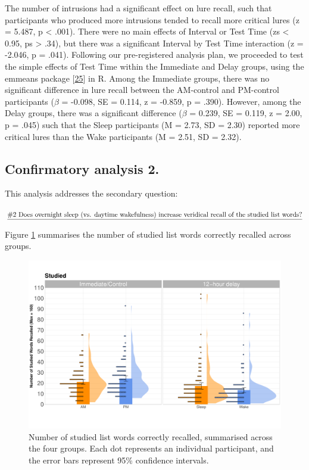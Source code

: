 \documentclass[
]{article}
\begin{document}
The number of intrusions had a significant effect on lure recall, such that participants who produced more intrusions tended to recall more critical lures (z = 5.487, p \textless{} .001). There were no main effects of Interval or Test Time (zs \textless{} 0.95, ps \textgreater{} .34), but there was a significant Interval by Test Time interaction (z = -2.046, p = .041). Following our pre-registered analysis plan, we proceeded to test the simple effects of Test Time within the Immediate and Delay groups, using the emmeans package {[}\protect\hyperlink{ref-lenth2021a}{25}{]} in R. Among the Immediate groups, there was no significant difference in lure recall between the AM-control and PM-control participants (\(\beta\) = -0.098, SE = 0.114, z = -0.859, p = .390). However, among the Delay groups, there was a significant difference (\(\beta\) = 0.239, SE = 0.119, z = 2.00, p = .045) such that the Sleep participants (M = 2.73, SD = 2.30) reported more critical lures than the Wake participants (M = 2.51, SD = 2.32).

\hypertarget{confirmatory-analysis-2.}{%
\subsection{Confirmatory analysis 2.}\label{confirmatory-analysis-2.}}

This analysis addresses the secondary question:

\(\text{\underline{\#2 Does overnight sleep (vs. daytime wakefulness) increase veridical recall of the studied list words?}}\)

Figure \ref{fig:studiedfig} summarises the number of studied list words correctly recalled across groups.

\begin{figure}

{\centering \includegraphics{Figures/studiedgraph} 

}

\caption{Number of studied list words correctly recalled, summarised across the four groups. Each dot represents an individual participant, and the error bars represent 95\% confidence intervals.}\label{fig:studiedfig}
\end{figure}
\end{document}

